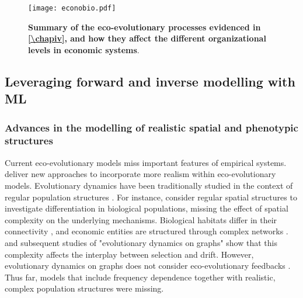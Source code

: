\begin{figure}[t]
    \centering
    \texttt{[image: econobio.pdf]}
    \caption{\textbf{Summary of the eco-evolutionary processes evidenced in \cref{\chapiv}, and how they affect the different organizational levels in economic systems}.}
    \label{fig:summary_econobio}
\end{figure}

% 

% 

\subsection{Leveraging forward and inverse modelling with ML}

\subsubsection{Advances in the modelling of realistic spatial and phenotypic structures}

Current eco-evolutionary models miss important features of empirical systems. \Cref{\chapi,\chapiv} deliver new approaches to incorporate more realism within eco-evolutionary models.
% 
% 
Evolutionary dynamics have been traditionally studied in the context of regular population structures \citep{LiebermanHauert2005}.
% 
For instance, \cite{Slatkin1973,Slatkin1978,Kirkpatrick1997,Polechova2015,Polechova2018,AndradeRestrepo2019,Doebeli2003,Meszena1997,Yeaman2011,Debarre2013,Mirrahimi2020} consider regular spatial structures to investigate differentiation in biological populations, missing the effect of spatial complexity on the underlying mechanisms.
% 
Biological habitats differ in their connectivity \xxx, and economic entities are structured through complex networks \xxx. \cite{LiebermanHauert2005} and subsequent studies of "evolutionary dynamics on graphs" \xxx show that this complexity affects the interplay between selection and drift. However, evolutionary dynamics on graphs does not consider eco-evolutionary feedbacks \citep{Govaert2019a}.
% 
Thus far, models that include frequency dependence together with realistic, complex population structures were missing.


